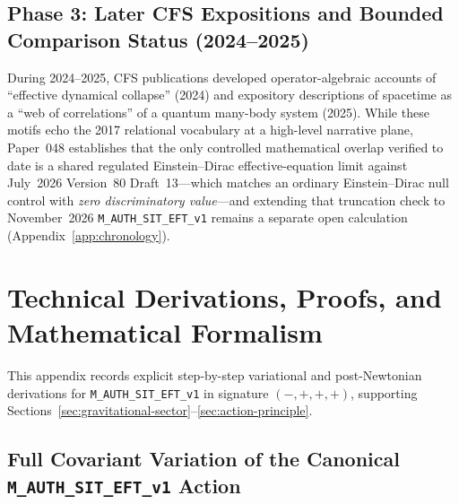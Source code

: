 \subsection{Phase 3: Later CFS Expositions and Bounded Comparison Status (2024--2025)}
During 2024--2025, CFS publications developed operator-algebraic accounts of ``effective dynamical collapse'' (2024) and expository descriptions of spacetime as a ``web of correlations'' of a quantum many-body system (2025). While these motifs echo the 2017 relational vocabulary at a high-level narrative plane, Paper~048 establishes that the only controlled mathematical overlap verified to date is a shared regulated Einstein--Dirac effective-equation limit against July~2026 Version~80 Draft~13---which matches an ordinary Einstein--Dirac null control with \emph{zero discriminatory value}---and extending that truncation check to November~2026 \texttt{M\_AUTH\_SIT\_EFT\_v1} remains a separate open calculation (Appendix~\ref{app:chronology}).



\section{Technical Derivations, Proofs, and Mathematical Formalism}
\label{app:tech-derivations}

This appendix records explicit step-by-step variational and post-Newtonian derivations for \texttt{M\_AUTH\_SIT\_EFT\_v1} in signature $(-,+,+,+)$, supporting Sections~\ref{sec:gravitational-sector}--\ref{sec:action-principle}.

\subsection{Full Covariant Variation of the Canonical \texttt{M\_AUTH\_SIT\_EFT\_v1} Action}

